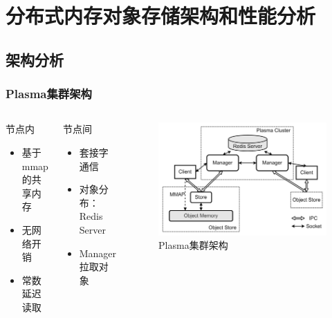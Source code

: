 \section{分布式内存对象存储架构和性能分析}

\subsection*{架构分析}
\begin{frame}
	\frametitle{Plasma集群架构}

	\vspace{-1.5em}
	\begin{columns}[t]
		\begin{block}{节点内}
			\begin{itemize}
				\item 基于mmap的共享内存
				\item 无网络开销
				\item 常数延迟读取
			\end{itemize}
		\end{block}
		\begin{block}{节点间}
			\begin{itemize}
				\item 套接字通信
				\item 对象分布：Redis Server
				\item Manager拉取对象
			\end{itemize}
		\end{block}
		\begin{figure}
			\centering
			\includegraphics[width=\textwidth]{image/chap02/plasma_arch.png}
			\caption{Plasma集群架构}
		\end{figure}
	\end{columns}

\end{frame}

